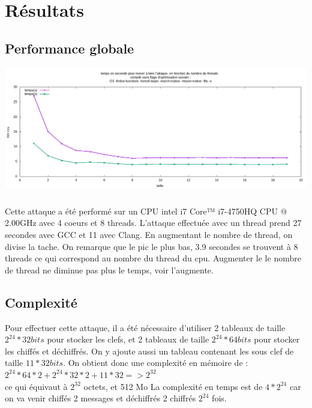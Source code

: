 \documentclass{report}
\begin{document}
\chapter{Résultats} 
\section{ Performance globale } 
\includegraphics[width=15cm]{../src/benchmarks/attack/img/attack.png}

\paragraph{} 
Cette attaque a été performé sur un CPU intel i7 Core™ i7-4750HQ CPU @ 2.00GHz avec 4 coeurs et 8 threads.  
L'attaque effectuée avec un thread prend 27 secondes avec GCC et 11 avec Clang.
En augmentant le nombre de thread, on divise la tache. On remarque que le pic le plus bas, 
3.9 secondes se trouvent à 8 threads ce qui correspond au nombre du thread du cpu. 
Augmenter le le nombre de thread ne diminue pas plus le temps, voir l'augmente.

\section{ Complexité } 
Pour effectuer cette attaque, il a été nécessaire d'utiliser 2 tableaux de taille $2^{24} * 32bits$ pour stocker les clefs, 
et 2 tableaux de taille $2^{24} * 64bits$ pour stocker les chiffés et déchiffrés. On y ajoute aussi un tableau contenant les sous clef de taille  $11 * 32bits$.
On obtient donc une complexité en mémoire de : $2^{24} * 64 * 2 + 2^{24} * 32 * 2+ 11 * 32 => 2^{32} $ 
\\ ce qui équivaut à $2^{32}$ octets, et 512 Mo   \newline
La complexité en temps est de $4 * 2^{24}$ car on va venir chiffés 2 messages et déchiffrés 2 chiffrés $2^{24}$ fois.
\end{document}
